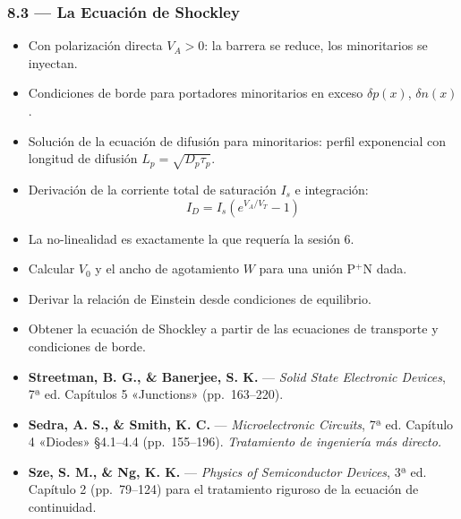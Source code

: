 \documentclass[11pt, letterpaper]{article}
\begin{document}
\subsubsection{8.3 — La Ecuación de Shockley}
\begin{itemize}
  \item Con polarización directa $V_A>0$: la barrera se reduce, los minoritarios se inyectan.
  \item Condiciones de borde para portadores minoritarios en exceso $\delta p(x)$, $\delta n(x)$.
  \item Solución de la ecuación de difusión para minoritarios: perfil exponencial con longitud de difusión $L_p=\sqrt{D_p\tau_p}$.
  \item Derivación de la corriente total de saturación $I_s$ e integración:
    \[I_D = I_s\left(e^{V_A/V_T}-1\right)\]
  \item La no-linealidad es exactamente la que requería la sesión 6.
\end{itemize}

\begin{objetivos}
\begin{itemize}
  \item Calcular $V_0$ y el ancho de agotamiento $W$ para una unión P$^+$N dada.
  \item Derivar la relación de Einstein desde condiciones de equilibrio.
  \item Obtener la ecuación de Shockley a partir de las ecuaciones de transporte y condiciones de borde.
\end{itemize}
\end{objetivos}

\begin{lecturas}
\begin{itemize}
  \item[$(\star)$] \textbf{Streetman, B. G., \& Banerjee, S. K.} — \emph{Solid State Electronic Devices}, 7ª ed. Capítulos 5 «Junctions» (pp.\ 163--220).
  \item[$(\star)$] \textbf{Sedra, A. S., \& Smith, K. C.} — \emph{Microelectronic Circuits}, 7ª ed. Capítulo 4 «Diodes» §4.1--4.4 (pp.\ 155--196). \textit{Tratamiento de ingeniería más directo.}
  \item \textbf{Sze, S. M., \& Ng, K. K.} — \emph{Physics of Semiconductor Devices}, 3ª ed. Capítulo 2 (pp.\ 79--124) para el tratamiento riguroso de la ecuación de continuidad.
\end{itemize}
\end{lecturas}
\end{document}

